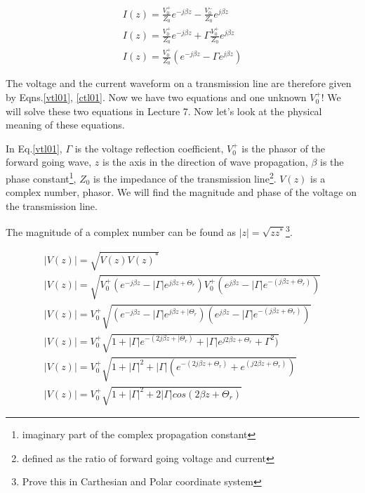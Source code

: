 \begin{eqnarray}
I(z) = \frac{V_0^+}{Z_0} e^{-j \beta z} -  \frac{V_0^-}{Z_0} e^{j \beta z} \label{ctl1}\\
I(z) =  \frac{V_0^+}{Z_0}  e^{-j \beta z} + \Gamma \frac{V_0^+}{Z_0}  e^{j \beta z} \nonumber
\\
I(z)=   \frac{V_0^+}{Z_0}  (e^{-j \beta z} - \Gamma  e^{j \beta z}  ) \label{ctl01}
\end{eqnarray}

The voltage and the current waveform on a transmission line are
therefore given by Eqns.\ref{vtl01}, \ref{ctl01}. Now we have two
equations and one unknown $V_0^+$! We will solve these two equations
in Lecture 7. Now let's look at the physical meaning of these
equations.


In Eq.\ref{vtl01}, $\Gamma$ is the voltage reflection coefficient,
$V_0^+$ is the phasor of the forward going wave, $z$ is the axis in
the direction of wave propagation, $\beta$ is the phase
constant\footnote{imaginary part of the complex propagation constant},
$Z_0$ is the impedance of the transmission line\footnote{defined as
the ratio of forward going voltage and current}. $V(z)$ is a complex
number, phasor. We will find the magnitude and phase of the voltage on
the transmission line.




The magnitude of a complex number can be found as $|z|=\sqrt{z
z^*}$\footnote{Prove this in Carthesian and Polar coordinate system}. 

\begin{eqnarray}
|V(z)|=\sqrt{V(z) V(z)^*} \nonumber  \\
|V(z)|=\sqrt{   V_0^+ (e^{-j \beta z} - |\Gamma|  e^{j \beta z +
 \Theta_r}  )  
   V_0^+ (e^{j \beta z} - |\Gamma|  e^{-(j \beta z + \Theta_r)}     )} \nonumber
\\
|V(z)|= V_0^+ \sqrt{(e^{-j \beta z} - |\Gamma|  e^{j \beta z +
|\Theta_r}  )  
  (e^{j \beta z} - |\Gamma|  e^{-(j \beta z + \Theta_r)}     )}
\nonumber \\
|V(z)|= V_0^+ \sqrt{1+  |\Gamma|  e^{-(2j \beta z +
|\Theta_r)}    + |\Gamma|  e^{j 2 \beta z + \Theta_r} +\Gamma^2     )}
\nonumber \\
|V(z)|= V_0^+ \sqrt{1+ |\Gamma|^2 + |\Gamma| ( e^{-(2j \beta z +
 \Theta_r)}   +  e^{(j 2 \beta z + \Theta_r)}     )}
 \nonumber \\
|V(z)|= V_0^+  \sqrt{1+ |\Gamma|^2 + 2 |\Gamma| cos(2 \beta z +\Theta_r)} \label{sw1} 
\end{eqnarray}

